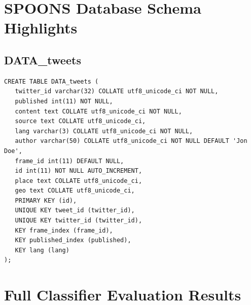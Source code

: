 \documentclass[12pt]{ucthesis}
\begin{document}

\appendix
\chapter{SPOONS Database Schema Highlights}
\label{appendix-db-schema}

\section{DATA\_tweets}
\begin{lstlisting}
CREATE TABLE DATA_tweets (
   twitter_id varchar(32) COLLATE utf8_unicode_ci NOT NULL,
   published int(11) NOT NULL,
   content text COLLATE utf8_unicode_ci NOT NULL,
   source text COLLATE utf8_unicode_ci,
   lang varchar(3) COLLATE utf8_unicode_ci NOT NULL,
   author varchar(50) COLLATE utf8_unicode_ci NOT NULL DEFAULT 'Jon Doe',
   frame_id int(11) DEFAULT NULL,
   id int(11) NOT NULL AUTO_INCREMENT,
   place text COLLATE utf8_unicode_ci,
   geo text COLLATE utf8_unicode_ci,
   PRIMARY KEY (id),
   UNIQUE KEY tweet_id (twitter_id),
   UNIQUE KEY twitter_id (twitter_id),
   KEY frame_index (frame_id),
   KEY published_index (published),
   KEY lang (lang)
);
\end{lstlisting}

\chapter{Full Classifier Evaluation Results}
\label{appendix-full-classifier}







\end{document}
